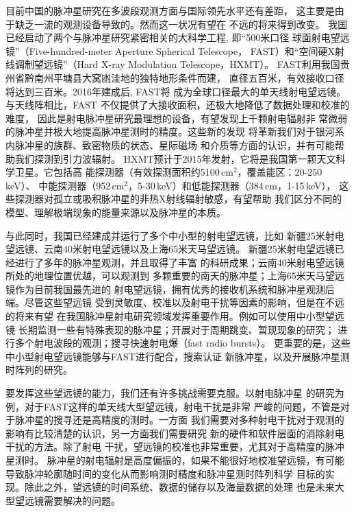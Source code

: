 目前中国的脉冲星研究在多波段观测方面与国际领先水平还有差距，
这主要是由于缺乏一流的观测设备导致的。然而这一状况有望在
不远的将来得到改变。
%
我国已经启动了两个与脉冲星研究紧密相关的大科学工程, 即“500米口径
球面射电望远镜”（Five-hundred-meter Aperture Spherical Telescope，
FAST）和“空间硬X射线调制望远镜”（Hard X-ray Modulation Telescope，HXMT）。
FAST利用我国贵州省黔南州平塘县大窝凼洼地的独特地形条件而建，
直径五百米，有效接收口径将达到三百米。2016年建成后, FAST将
成为全球口径最大的单天线射电望远镜。与天线阵相比，FAST
不仅提供了大接收面积，还极大地降低了数据处理和校准的难度，
因此是射电脉冲星研究最理想的设备，有望发现上千颗射电辐射非
常微弱的脉冲星并极大地提高脉冲星测时的精度。这些新的发现
将革新我们对于银河系内脉冲星的族群、致密物质的状态、星际磁场
和介质等方面的认识，并有可能帮助我们探测到引力波辐射。
HXMT预计于2015年发射，它将是我国第一颗天文科学卫星。它包括高
能探测器（有效探测面积约5100\,cm$^2$，覆盖能区：20-250\,keV）、
中能探测器（952\,cm$^2$，5-30\,keV）和低能探测器（384\,cm，1-15\,keV），
这些探测器对孤立或吸积脉冲星的非热X射线辐射敏感，有望帮助
我们区分不同的模型、理解极端现象的能量来源以及脉冲星的本质。
%

与此同时，我国已经建成并运行了多个中小型的射电望远镜，比如
新疆25米射电望远镜、云南40米射电望远镜以及上海65米天马望远镜。
新疆25米射电望远镜已经进行了多年的脉冲星观测，并且取得了丰富
的科研成果；云南40米射电望远镜所处的地理位置优越，可以观测到
多颗重要的南天的脉冲星；上海65米天马望远镜作为目前我国最先进的
射电望远镜，拥有优秀的接收机系统和脉冲星观测后端。尽管这些望远镜
受到灵敏度、校准以及射电干扰等因素的影响，但是在不远的将来有望
在我国脉冲星射电研究领域发挥重要作用。例如可以使用中小型望远镜
长期监测一些有特殊表现的脉冲星；开展对于周期跳变、暂现现象的研究；
进行多个射电波段的观测；搜寻快速射电爆（fast radio bursts）。
更重要的是，这些中小型射电望远镜能够与FAST进行配合，搜索认证
新脉冲星，以及开展脉冲星测时阵列的研究。

要发挥这些望远镜的能力，我们还有许多挑战需要克服。以射电脉冲星
的研究为例，对于FAST这样的单天线大型望远镜，射电干扰是非常
严峻的问题，不管是对于脉冲星的搜寻还是高精度的测时。一方面
我们需要对多种射电干扰对于观测的影响有比较清楚的认识，另一方面我们需要研究
新的硬件和软件层面的消除射电干扰的方法。除了射电
干扰，望远镜的校准也非常重要，尤其对于高精度的脉冲星测时。
脉冲星的射电辐射是高度偏振的，如果不能很好地校准望远镜，有可能
导致脉冲轮廓随时间的变化从而影响测时精度和脉冲星测时阵列科学
目标的实现。除此之外，望远镜的时间系统、数据的储存以及海量数据的处理
也是未来大型望远镜需要解决的问题。

